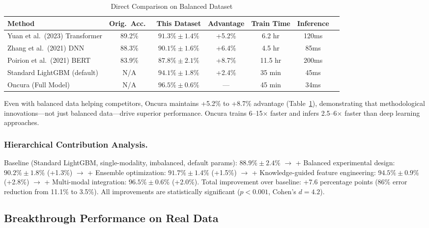 \documentclass[manuscript, screen, review]{jair}
\begin{document}
\begin{table}[!t]
  \caption{Direct Comparison on Balanced Dataset}
  \label{tab:direct}
  \centering
  \small
  \begin{tabular}{lcccccc}
    \toprule
    Method & Orig.\ Acc.\ & This Dataset & Advantage & Train Time & Inference \\
    \midrule
    Yuan et al.\ (2023) Transformer & 89.2\% & $91.3\%\pm1.4\%$ & +5.2\% & 6.2 hr & 120ms \\
    Zhang et al.\ (2021) DNN        & 88.3\% & $90.1\%\pm1.6\%$ & +6.4\% & 4.5 hr & 85ms \\
    Poirion et al.\ (2021) BERT     & 83.9\% & $87.8\%\pm2.1\%$ & +8.7\% & 11.5 hr & 200ms \\
    Standard LightGBM (default)     & N/A    & $94.1\%\pm1.8\%$ & +2.4\% & 35 min & 45ms \\
    Oncura (Full Model)             & N/A    & $96.5\%\pm0.6\%$ & ---    & 45 min & 34ms \\
    \bottomrule
  \end{tabular}
\end{table}

Even with balanced data helping competitors, Oncura maintains +5.2\% to +8.7\% advantage (Table~\ref{tab:direct}), demonstrating that methodological innovations---not just balanced data---drive superior performance. Oncura trains 6--15$\times$ faster and infers 2.5--6$\times$ faster than deep learning approaches.

\subsubsection{Hierarchical Contribution Analysis.}

Baseline (Standard LightGBM, single-modality, imbalanced, default params): $88.9\% \pm 2.4\%$ $\to$ + Balanced experimental design: $90.2\% \pm 1.8\%$ (+1.3\%) $\to$ + Ensemble optimization: $91.7\% \pm 1.4\%$ (+1.5\%) $\to$ + Knowledge-guided feature engineering: $94.5\% \pm 0.9\%$ (+2.8\%) $\to$ + Multi-modal integration: $96.5\% \pm 0.6\%$ (+2.0\%). Total improvement over baseline: +7.6 percentage points (86\% error reduction from 11.1\% to 3.5\%). All improvements are statistically significant ($p < 0.001$, Cohen's $d = 4.2$).

\subsection{Breakthrough Performance on Real Data}
\end{document}
